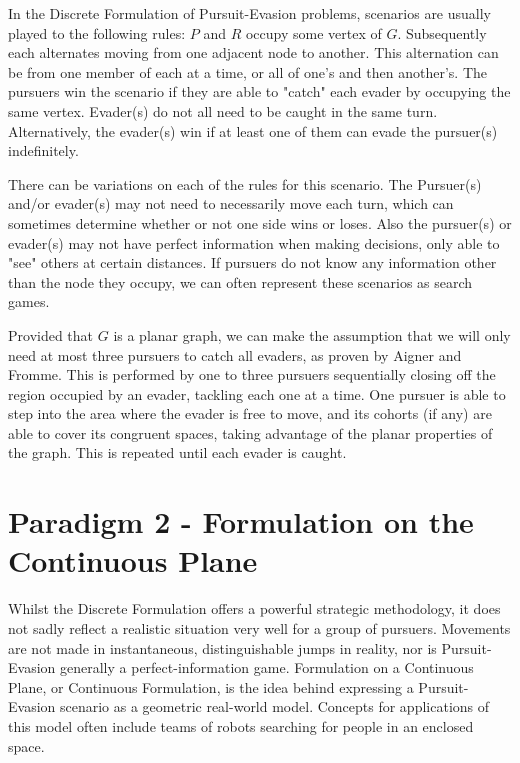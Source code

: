 \documentclass{article}
\begin{document}
In the Discrete Formulation of Pursuit-Evasion problems, scenarios are usually played to the following rules: \(P\) and \(R\) occupy some vertex of \(G\). Subsequently each alternates moving from one adjacent node to another. This alternation can be from one member of each at a time, or all of one's and then another's. The pursuers win the scenario if they are able to "catch" each evader by occupying the same vertex. Evader(s) do not all need to be caught in the same turn. Alternatively, the evader(s) win if at least one of them can evade the pursuer(s) indefinitely.\cite{copsRobbers}

There can be variations on each of the rules for this scenario. The Pursuer(s) and/or evader(s) may not need to necessarily move each turn, which can sometimes determine whether or not one side wins or loses. Also the pursuer(s) or evader(s) may not have perfect information when making decisions, only able to "see" others at certain distances. If pursuers do not know any information other than the node they occupy, we can often represent these scenarios as search games. \cite{parsons}

Provided that \(G\) is a planar graph, we can make the assumption that we will only need at most three pursuers to catch all evaders, as proven by Aigner and Fromme. This is performed by one to three pursuers sequentially closing off the region occupied by an evader, tackling each one at a time. One pursuer is able to step into the area where the evader is free to move, and its cohorts (if any) are able to cover its congruent spaces, taking advantage of the planar properties of the graph. This is repeated until each evader is caught. \cite{copsRobbers}

\section{Paradigm 2 - Formulation on the Continuous Plane}
Whilst the Discrete Formulation offers a powerful strategic methodology, it does not sadly reflect a realistic situation very well for a group of pursuers. Movements are not made in instantaneous, distinguishable jumps in reality, nor is Pursuit-Evasion generally a perfect-information game. Formulation on a Continuous Plane, or Continuous Formulation, is the idea behind expressing a Pursuit-Evasion scenario as a geometric real-world model. Concepts for applications of this model often include teams of robots searching for people in an enclosed space.
\end{document}
